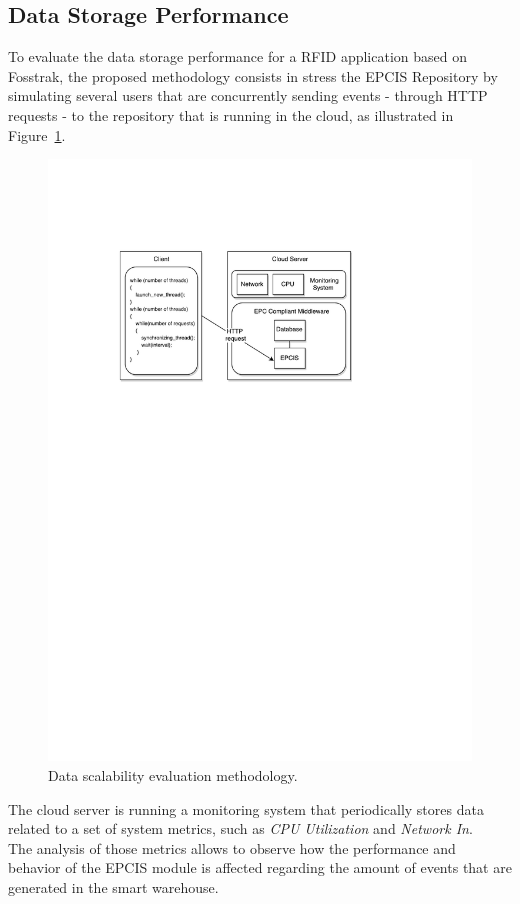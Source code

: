 \subsection{Data Storage Performance}
\label{sub:eval_methodology_data}
To evaluate the data storage performance for a \gls{RFID} application based on Fosstrak, the proposed
methodology consists in stress the \gls{EPCIS} Repository by simulating several users that are
concurrently sending events - through \gls{HTTP} requests - to the repository that is
running in the cloud, as illustrated in Figure~\ref{fig:eval_data_methodology}.

\begin{figure}[ht!]
  \centering
  \includegraphics[width=.7\textwidth]{./images/eval_data_methodology}
  \caption{Data scalability evaluation methodology.}
  \label{fig:eval_data_methodology}
\end{figure}

The cloud server is running a monitoring system that periodically stores data related to a set of
system metrics, such as \textit{CPU Utilization} and \textit{Network In}.\\

The analysis of those metrics allows to observe how the performance and behavior of the \gls{EPCIS}
module is affected regarding the amount of events that are generated in the smart warehouse.

